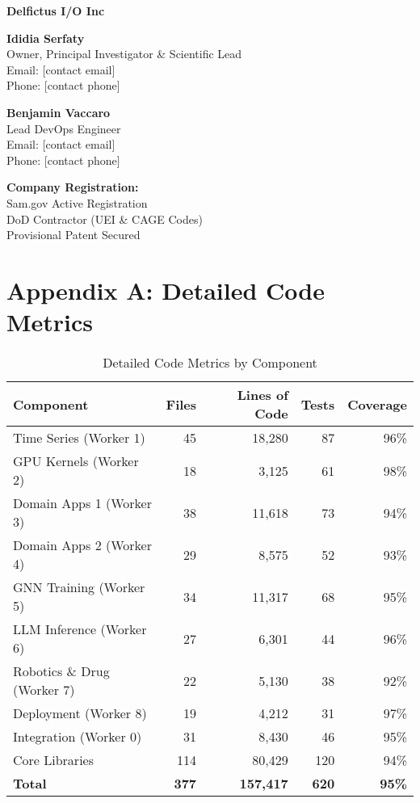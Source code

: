 \documentclass[11pt,letterpaper]{article}
\begin{document}
\vspace{1cm}

\begin{tcolorbox}[colback=primaryblue,colframe=primaryblue,colupper=white,title=Contact Information]
\textbf{Delfictus I/O Inc}

\textbf{Ididia Serfaty}\\
Owner, Principal Investigator \& Scientific Lead\\
Email: [contact email]\\
Phone: [contact phone]

\textbf{Benjamin Vaccaro}\\
Lead DevOps Engineer\\
Email: [contact email]\\
Phone: [contact phone]

\vspace{0.3cm}
\textbf{Company Registration:}\\
Sam.gov Active Registration\\
DoD Contractor (UEI \& CAGE Codes)\\
Provisional Patent Secured
\end{tcolorbox}

\newpage

\section*{Appendix A: Detailed Code Metrics}

\begin{table}[H]
\centering
\begin{tabularx}{\textwidth}{Xrrrr}
\toprule
\textbf{Component} & \textbf{Files} & \textbf{Lines of Code} & \textbf{Tests} & \textbf{Coverage} \\
\midrule
Time Series (Worker 1) & 45 & 18,280 & 87 & 96\% \\
GPU Kernels (Worker 2) & 18 & 3,125 & 61 & 98\% \\
Domain Apps 1 (Worker 3) & 38 & 11,618 & 73 & 94\% \\
Domain Apps 2 (Worker 4) & 29 & 8,575 & 52 & 93\% \\
GNN Training (Worker 5) & 34 & 11,317 & 68 & 95\% \\
LLM Inference (Worker 6) & 27 & 6,301 & 44 & 96\% \\
Robotics \& Drug (Worker 7) & 22 & 5,130 & 38 & 92\% \\
Deployment (Worker 8) & 19 & 4,212 & 31 & 97\% \\
Integration (Worker 0) & 31 & 8,430 & 46 & 95\% \\
Core Libraries & 114 & 80,429 & 120 & 94\% \\
\midrule
\textbf{Total} & \textbf{377} & \textbf{157,417} & \textbf{620} & \textbf{95\%} \\
\bottomrule
\end{tabularx}
\caption{Detailed Code Metrics by Component}
\end{table}
\end{document}
